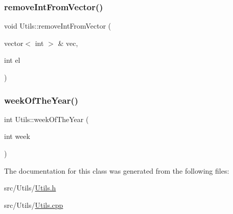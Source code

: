 \subsubsection{\texorpdfstring{remove\+Int\+From\+Vector()}{removeIntFromVector()}}
{\footnotesize\ttfamily void Utils\+::remove\+Int\+From\+Vector (\begin{DoxyParamCaption}\item[{vector$<$ int $>$ \&}]{vec,  }\item[{int}]{el }\end{DoxyParamCaption})\hspace{0.3cm}{\ttfamily [static]}}

\mbox{\label{classUtils_a8318227e82678b727c4de0dda180e64a_a8318227e82678b727c4de0dda180e64a}} 
\subsubsection{\texorpdfstring{week\+Of\+The\+Year()}{weekOfTheYear()}}
{\footnotesize\ttfamily int Utils\+::week\+Of\+The\+Year (\begin{DoxyParamCaption}\item[{int}]{week }\end{DoxyParamCaption})\hspace{0.3cm}{\ttfamily [static]}}



The documentation for this class was generated from the following files\+:\begin{DoxyCompactItemize}
\item 
src/\+Utils/\mbox{\hyperlink{Utils_8h}{Utils.\+h}}\item 
src/\+Utils/\mbox{\hyperlink{Utils_8cpp}{Utils.\+cpp}}\end{DoxyCompactItemize}
